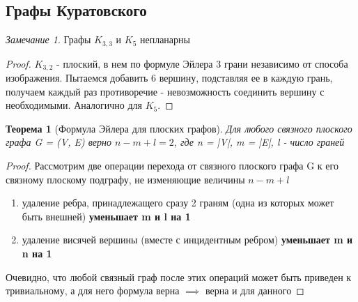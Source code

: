\documentclass[a4paper]{article}
\newtheorem{theorem}{Теорема}[section]
\theoremstyle{definition}
\theoremstyle{remark}
\newtheorem*{remark}{Замечание}
\begin{document}
    \subsection*{Графы Куратовского}
    \begin{remark}
        Графы $K_{3,3}$ и $K_5$ непланарны
    \end{remark}
    \begin{proof}
        $K_{3, 2}$ - плоский, в нем по формуле Эйлера 3 грани независимо от способа изображения.
        Пытаемся добавить 6 вершину, подставляя ее в каждую грань, получаем каждый раз противоречие - 
        невозможность соединить вершину с необходимыми.
        Аналогично для $K_5$.
    \end{proof}
    \begin{theorem}[Формула Эйлера для плоских графов]
        Для любого связного плоского графа G = (V, E) верно $n - m + l = 2$, где n = |V|, m = |E|,
        l - число граней 
    \end{theorem}
    \begin{proof}
        Рассмотрим две операции перехода от связного плоского графа G к его связному 
        плоскому подграфу, не изменяющие величины $n - m + l$
        \begin{enumerate}
            \item удаление ребра, принадлежащего сразу 2 граням (одна из которых может быть внешней) \textbf{уменьшает m и l на 1}
            \item удаление висячей вершины (вместе с инцидентным ребром) \textbf{уменьшает m и n на 1}
        \end{enumerate}
        Очевидно, что любой связный граф после этих операций может быть приведен к тривиальному, а для него формула верна $\implies$
        верна и для данного 
    \end{proof}
\end{document}
